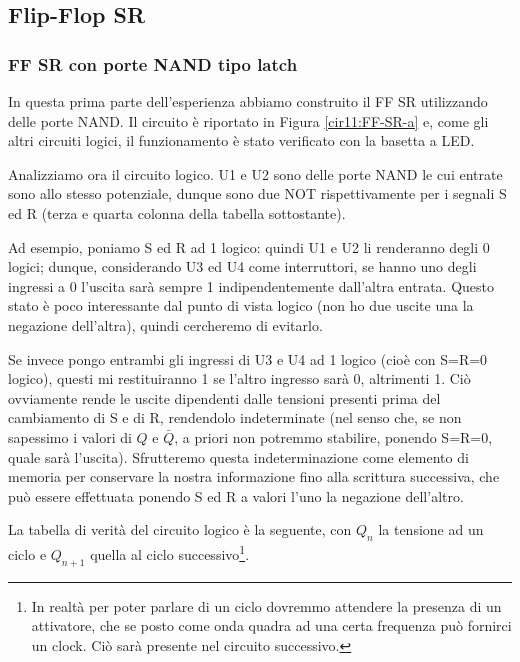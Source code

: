 \subsection{Flip-Flop SR}

\subsubsection*{FF SR con porte NAND tipo latch}


In questa prima parte dell'esperienza abbiamo construito il FF SR utilizzando delle porte NAND.
Il circuito è riportato in Figura \ref{cir11:FF-SR-a} e, come gli altri circuiti logici, il funzionamento è stato verificato con la basetta a LED.

Analizziamo ora il circuito logico.
U1 e U2 sono delle porte NAND le cui entrate sono allo stesso potenziale, dunque sono due NOT rispettivamente per i segnali S ed R (terza e quarta colonna della tabella sottostante).

Ad esempio, poniamo S ed R ad 1 logico: quindi U1 e U2 li renderanno degli 0 logici; dunque, considerando U3 ed U4 come interruttori, se hanno uno degli ingressi a 0 l'uscita sarà sempre 1 indipendentemente dall'altra entrata.
Questo stato è poco interessante dal punto di vista logico (non ho due uscite una la negazione dell'altra), quindi cercheremo di evitarlo.

Se invece pongo entrambi gli ingressi di U3 e U4 ad 1 logico (cioè con S=R=0 logico), questi mi restituiranno 1 se l'altro ingresso sarà 0, altrimenti 1.
Ciò ovviamente rende le uscite dipendenti dalle tensioni presenti prima del cambiamento di S e di R, rendendolo indeterminate (nel senso che, se non sapessimo i valori di $Q$ e $\bar Q$, a priori non potremmo stabilire, ponendo S=R=0, quale sarà l'uscita).
Sfrutteremo questa indeterminazione come elemento di memoria per conservare la nostra informazione fino alla scrittura successiva, che può essere effettuata ponendo S ed R a valori l'uno la negazione dell'altro.

La tabella di verità del circuito logico è la seguente, con $Q_n$ la tensione ad un ciclo e $Q_{n+1}$ quella al ciclo successivo\footnote{In realtà per poter parlare di un ciclo dovremmo attendere la presenza di un attivatore, che se posto come onda quadra ad una certa frequenza può fornirci un clock.
Ciò sarà presente nel circuito successivo.}.

